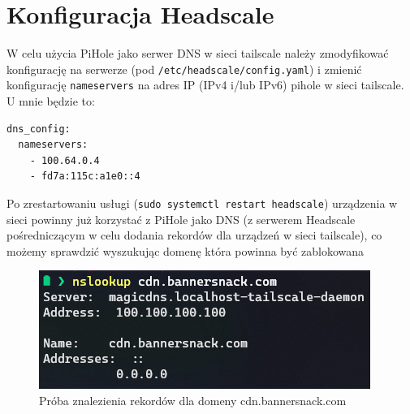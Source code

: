 \documentclass{report}
\numberwithin{equation}{section}
\begin{document}
\section{Konfiguracja Headscale}
W celu użycia PiHole jako serwer DNS w sieci tailscale należy zmodyfikować konfigurację na serwerze (pod \texttt{/etc/headscale/config.yaml}) i zmienić konfigurację \texttt{nameservers} na adres IP (IPv4 i/lub IPv6) pihole w sieci tailscale. U mnie będzie to:
\begin{verbatim}
dns_config:
  nameservers:
    - 100.64.0.4
    - fd7a:115c:a1e0::4
\end{verbatim}
Po zrestartowaniu usługi (\texttt{sudo systemctl restart headscale}) urządzenia w sieci powinny już korzystać z PiHole jako DNS (z serwerem Headscale pośredniczącym w celu dodania rekordów dla urządzeń w sieci tailscale), co możemy sprawdzić wyszukując domenę która powinna być zablokowana
\begin{figure}[H]
    \centering
    \includegraphics[scale=0.75]{pihole-test.png}
    \caption{Próba znalezienia rekordów dla domeny cdn.bannersnack.com}
    \label{fig:pihole_test}
\end{figure}
\end{document}
